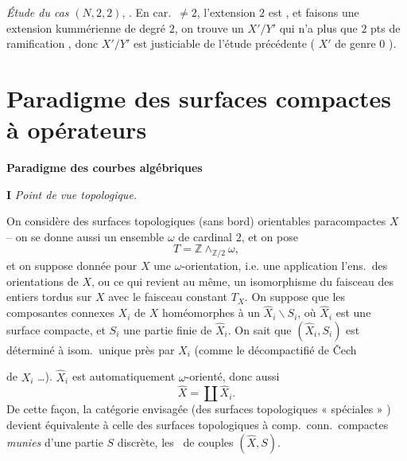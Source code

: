 \documentclass[11pt,a4paper]{article}
\begin{document}
\emph{Étude du cas} $(N, 2, 2)$, .
En car.\ $\neq 2$, l'extension \add{\ill{}}  $2$ est
, et faisons une extension kummérienne de
degré $2$, on trouve un $X'/Y'$ qui n'a plus que $2$ pts de ramification
\struck{\ill{}}, donc $X'/Y'$ est justiciable de l'étude précédente
\ill{} \struck{\ill{}} (\ill{} $X'$ de genre $0$ \ill{}).


\section{Paradigme  des surfaces compactes à opérateurs}

\textbf{Paradigme des courbes algébriques}

\textbf{I} \quad \emph{Point de vue topologique.}

On considère des surfaces topologiques (sans bord) orientables
paracompactes $X$ -- on se donne aussi un ensemble $\omega$ de cardinal $2$,
et on pose
\[
  T = \mathbb{Z} \wedge_{\mathbb{Z}/2} \omega ,
\]
et on suppose donnée pour $X$ une $\omega$-orientation, i.e. une
application \struck{\ill{}} 
l'ens.\ des orientations de $X$, ou ce qui revient au même, un isomorphisme
du faisceau des entiers tordus sur $X$ avec le faisceau constant $T_X$.
On suppose que les composantes connexes $X_i$ de $X$  
homéomorphes à un $\hat{X}_i \smallsetminus S_i$, où $\hat{X}_i$ est une
surface compacte, et $S_i$ une partie finie de $\hat{X}_i$. On sait que
$(\hat{X}_i, S_i)$ est déterminé à isom.\ unique près par $X_i$
(comme le décompactifié de Čech

de $X_i$  \ldots).
 $\hat{X}_i$ est automatiquement $\omega$-orienté, donc aussi
\[
  \hat{X} = \coprod \hat{X}_i .
\]
De cette façon, la catégorie envisagée (des surfaces topologiques
« spéciales » 
) devient équivalente à 
celle des surfaces topologiques à comp.\ conn.\ compactes \emph{munies}
d'une partie \struck{\ill{}} $S$ discrète, \ill{} les \ de
couples $(\hat{X}, S)$.
\end{document}

